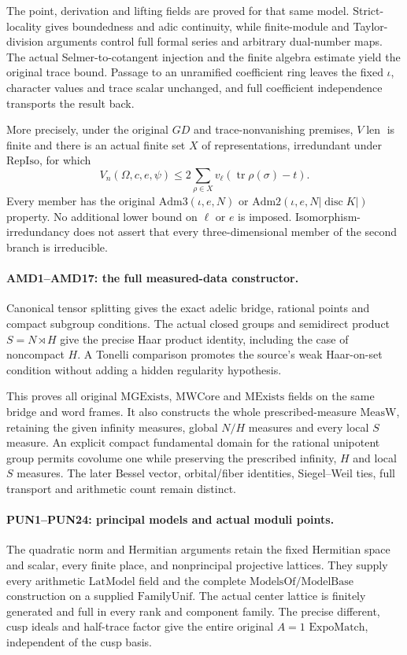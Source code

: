 The point, derivation and lifting fields are proved for that same
model. Strict-locality gives boundedness and adic continuity, while
finite-module and Taylor-division arguments control full formal
series and arbitrary dual-number maps. The actual Selmer-to-cotangent
injection and the finite algebra estimate yield the original trace
bound. Passage to an unramified coefficient ring leaves the fixed
\(\iota\), character values and trace scalar unchanged, and full
coefficient independence transports the result back.

More precisely, under the original \(GD\) and trace-nonvanishing
premises, \(V\!\operatorname{len}\) is finite and there is an actual
finite set \(X\) of representations, irredundant under
\(\mathrm{RepIso}\), for which
\[
 V_n(\Omega,c,e,\psi)
 \le 2\sum_{\rho\in X}
   v_\ell\!\left(\operatorname{tr}\rho(\sigma)-t\right).
\]
Every member has the original \(\mathrm{Adm3}(\iota,e,N)\) or
\(\mathrm{Adm2}(\iota,e,N|\operatorname{disc}K|)\) property.
No additional lower bound on \(\ell\) or \(e\) is imposed.
Isomorphism-irredundancy does not assert that every three-dimensional
member of the second branch is irreducible.

\paragraph{AMD1--AMD17: the full measured-data constructor.}
Canonical tensor splitting gives the exact adelic bridge, rational
points and compact subgroup conditions. The actual closed groups
and semidirect product \(S=N\rtimes H\) give the precise Haar
product identity, including the case of noncompact \(H\).
A Tonelli comparison promotes the source's weak Haar-on-set condition
without adding a hidden regularity hypothesis.

This proves all original \(\mathrm{MGExists}\),
\(\mathrm{MWCore}\) and \(\mathrm{MExists}\) fields on the same
bridge and word frames. It also constructs the whole prescribed-measure
\(\mathrm{MeasW}\), retaining the given infinity measures, global
\(N/H\) measures and every local \(S\) measure. An explicit compact
fundamental domain for the rational unipotent group permits covolume
one while preserving the prescribed infinity, \(H\) and local
\(S\) measures. The later Bessel vector, orbital/fiber identities,
Siegel--Weil ties, full transport and arithmetic count remain distinct.

\paragraph{PUN1--PUN24: principal models and actual moduli points.}
The quadratic norm and Hermitian arguments retain the fixed
Hermitian space and scalar, every finite place, and nonprincipal
projective lattices. They supply every arithmetic \(\mathrm{LatModel}\)
field and the complete \(\mathrm{ModelsOf}/\mathrm{ModelBase}\)
construction on a supplied \(\mathrm{FamilyUnif}\).
The actual center lattice is finitely generated and full in every
rank and component family. The precise different, cusp ideals and
half-trace factor give the entire original \(A=1\)
\(\mathrm{ExpoMatch}\), independent of the cusp basis.

